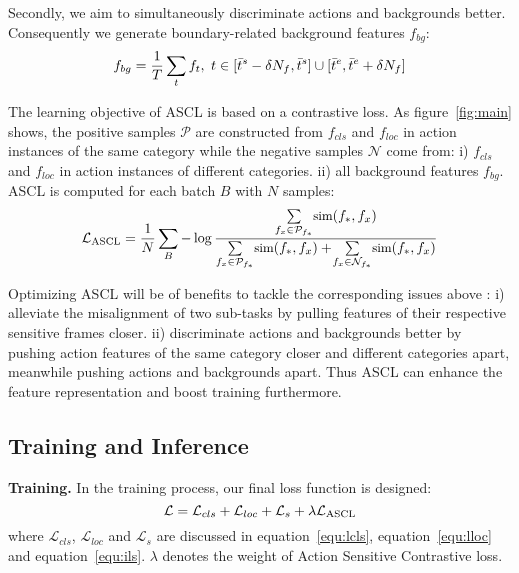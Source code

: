 \documentclass[10pt,twocolumn,letterpaper]{article}
\begin{document}
\par Secondly, we aim to simultaneously discriminate actions and backgrounds better. Consequently we generate boundary-related background features $f_{bg}$:
\begin{equation} \small
    f_{bg} = \frac{1}{T} \sum_{t} f_t, \ t \in [\bar t^s-\delta N_f, \bar t^s]\cup [\bar t^e, \bar t^e+\delta N_f] 
\end{equation}
\par The learning objective of ASCL is based on a contrastive loss. As figure~\ref{fig:main} shows, the positive samples $\mathcal{P}$ are constructed from $f_{cls}$ and $f_{loc}$ in action instances of the same category while the negative samples $\mathcal{N}$ come from: i) $f_{cls}$ and $f_{loc}$ in action instances of different categories. ii) all background features $f_{bg}$. ASCL is computed for each batch $B$ with $N$ samples: 
\begin{equation} \small{ 
    \mathcal{L}_{\text{ASCL}} = \frac{1}{N}\sum_{B} -\log \frac{ \sum\limits_{f_x\in \mathcal{P}_{f_*}}\!\text{sim}(f_*, f_x) }{\sum\limits_{f_x \in \mathcal{P}_{f_*}}\! \text{sim}(f_*, f_x) +\! \sum\limits_{f_x \in \mathcal{N}_{f_*}}\! \text{sim}(f_*, f_x) }}
\end{equation}
\par Optimizing ASCL will be of benefits to tackle the corresponding issues above : 
i) alleviate the misalignment of two sub-tasks by pulling features of their respective sensitive frames closer.
ii) discriminate actions and backgrounds better by pushing action features of the same category closer and different categories apart, meanwhile pushing actions and backgrounds apart. Thus ASCL can enhance the feature representation and boost training furthermore.


\subsection{Training and Inference}
\label{sec:trainandinfer}
\textbf{Training.} In the training process, our final loss function is designed: 
\begin{equation} \small
    \mathcal{L}=\mathcal{L}_{cls} + \mathcal{L}_{loc} + \mathcal{L}_{s} + \lambda \mathcal{L}_{\text{ASCL}}
\end{equation}
where $\mathcal{L}_{cls}$, $\mathcal{L}_{loc}$ and $\mathcal{L}_{s}$ are discussed in equation~\ref{equ:lcls}, equation~\ref{equ:lloc} and equation~\ref{equ:ils}. $\lambda$ denotes the weight of Action Sensitive Contrastive loss.
\end{document}
